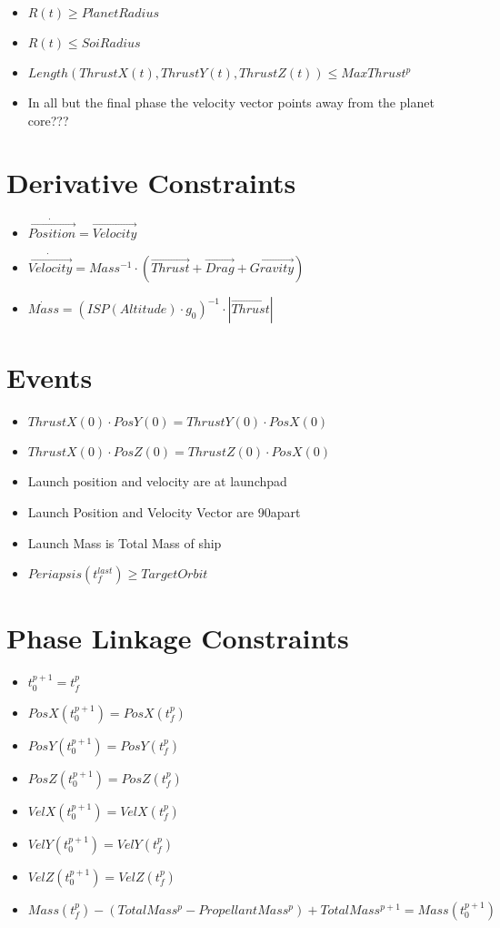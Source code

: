 \documentclass[11pt]{report}
\begin{document}
\begin{itemize}
\item $R(t) \geq PlanetRadius$
\item $R(t) \leq SoiRadius$
\item $Length(ThrustX(t), ThrustY(t), ThrustZ(t)) \leq MaxThrust^p$
\item In all but the final phase the velocity vector points away from the planet core???
\end{itemize}

\section{Derivative Constraints}

\begin{itemize}
\item $\dot{\overrightarrow{Position}} = \overrightarrow{Velocity}$
\item $\dot{\overrightarrow{Velocity}} = Mass^{-1}\cdot\left(\overrightarrow{Thrust} + \overrightarrow{Drag} + \overrightarrow{Gravity}\right)$
\item $\dot{Mass} = (ISP(Altitude) \cdot g_0)^{-1}\cdot\left|\overrightarrow{Thrust}\right|$
\end{itemize}
\section{Events}

\begin{itemize}
\item $ThrustX(0) \cdot PosY(0) = ThrustY(0) \cdot PosX(0)$
\item $ThrustX(0) \cdot PosZ(0) = ThrustZ(0) \cdot PosX(0)$
\item Launch position and velocity are at launchpad
\item Launch Position and Velocity Vector are 90\textdegree apart
\item Launch Mass is Total Mass of ship
\item $Periapsis(t_f^{last}) \geq TargetOrbit$
\end{itemize}

\section{Phase Linkage Constraints}

\begin{itemize}
\item $t_0^{p+1} = t_f^p$
\item $PosX(t_0^{p+1}) = PosX(t_f^p)$
\item $PosY(t_0^{p+1}) = PosY(t_f^p)$
\item $PosZ(t_0^{p+1}) = PosZ(t_f^p)$
\item $VelX(t_0^{p+1}) = VelX(t_f^p)$
\item $VelY(t_0^{p+1}) = VelY(t_f^p)$
\item $VelZ(t_0^{p+1}) = VelZ(t_f^p)$
\item $Mass(t_f^p) - (TotalMass^p - PropellantMass^p) + TotalMass^{p+1} = Mass(t_0^{p+1})$
\end{itemize}
\end{document}
